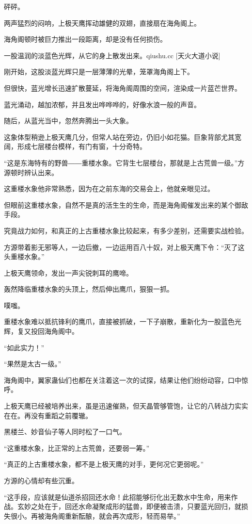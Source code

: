 \begin{this_body}
砰砰。

两声猛烈的闷响，上极天鹰挥动雄健的双翅，直接扇在海角阁上。

海角阁顿时被巨力推出一段距离，却是没有任何损伤。

一股温润的淡蓝色光辉，从它的身上散发出来。qiushu.cc [天火大道小说]

刚开始，这股淡蓝光辉只是一层薄薄的光晕，笼罩海角阁上下。

但很快，蓝光增长迅速扩散蔓延，将海角阁周围的空间，渲染成一片蓝芒世界。

蓝光涌动，越加浓郁，并且发出哗哗哗的，好像水浪一般的声音。

随后，从蓝光当中，忽然奔腾出一头大象。

这象体型稍逊上极天鹰几分，但常人站在旁边，仍旧小如花猫。巨象背部尤其宽阔，形成七层楼台模样，有门有窗，十分奇特。

“这是东海特有的野兽――重楼水象。它背生七层楼台，那就是上古荒兽一级。”方源顿时辨认出来。

这重楼水象他非常熟悉，因为在之前东海的交易会上，他就亲眼见过。

但眼前这重楼水象，自然不是真的活生生的生命，而是海角阁催发出来的某个御敌手段。

究竟战力如何，和真正的上古重楼水象比较起来，有多少差别，还需要实战检验。

方源带着影无邪等人，一边后撤，一边运用百八十奴，对上极天鹰下令：“灭了这头重楼水象。”

上极天鹰领命，发出一声尖锐刺耳的鹰啼。

轰然降临重楼水象的头顶上，然后伸出鹰爪，狠狠一抓。

噗嗤。

重楼水象难以抵抗锋利的鹰爪，直接被抓破，一下子崩散，重新化为一股蓝色光辉，复又投回海角阁中。

“如此实力！”

“果然是太古一级。”

海角阁中，翼家蛊仙们也都在关注着这一次的试探，结果让他们纷纷动容，口中惊呼。

上极天鹰已经被培养出来，虽是迅速催熟，但天晶管够管饱，让它的八转战力实实在在。再没有重蹈之前覆辙。

黑楼兰、妙音仙子等人同时松了一口气。

“这重楼水象，比正常的上古荒兽，还要弱一筹。”

“真正的上古重楼水象，都不是上极天鹰的对手，更何况它更弱呢。”

方源的心情却有些沉重。

“这手段，应该就是仙道杀招回还水命！此招能够衍化出无数水中生命，用来作战。玄妙之处在于，回还水命凝聚成形的猛兽，即便被击溃，只要蓝光回归，就损失很小。再被海角阁重新酝酿，就会再次成形，轻而易举。”


\end{this_body}
